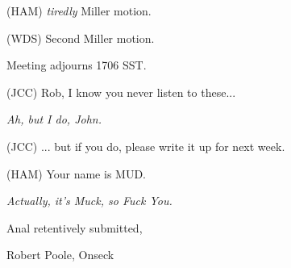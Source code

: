 (HAM) {\em tiredly\/} Miller motion.

(WDS) Second Miller motion.

Meeting adjourns 1706 SST.

(JCC) Rob, I know you never listen to these...

{\em Ah, but I do, John.}

(JCC) ... but if you do, please write it up for next week.

(HAM) Your name is MUD.

{\em Actually, it's Muck, so Fuck You.}

\vspace{0.15in}
\begin{center}
Anal retentively submitted,

Robert Poole, Onseck
\end{center}


